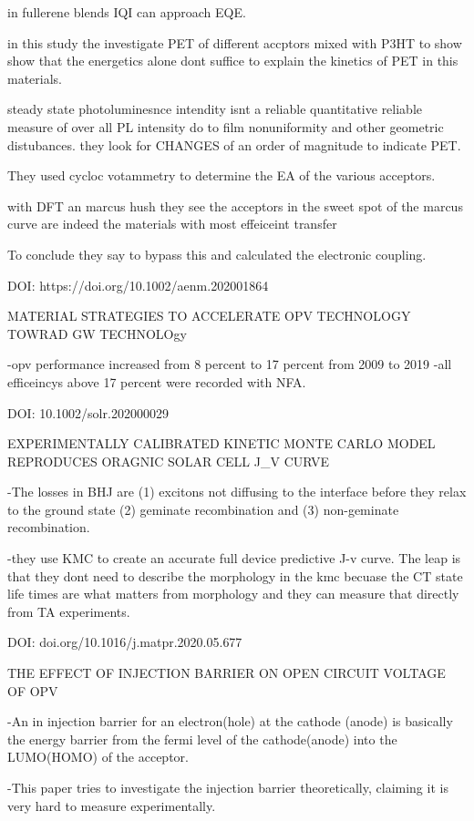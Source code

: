 		in fullerene blends IQI can approach EQE.

		in this study the investigate PET of different accptors mixed with P3HT to show
		show that the energetics alone dont suffice to explain the kinetics of PET
		in this materials.

		steady state photoluminesnce intendity isnt a reliable quantitative reliable measure
		of over all PL intensity do to film nonuniformity and other geometric distubances.
		they look for CHANGES of an order of magnitude to indicate PET. 

		They used cycloc votammetry to determine the EA of the various acceptors. 

		with DFT an marcus hush they see the acceptors in the sweet spot of the marcus
		curve are indeed the materials with most effeiceint transfer
			
		To conclude they say to bypass this and calculated the electronic coupling.

DOI: https://doi.org/10.1002/aenm.202001864

	MATERIAL STRATEGIES TO ACCELERATE OPV TECHNOLOGY TOWRAD GW TECHNOLOgy

		-opv performance increased from 8 percent to 17 percent from 2009 to 2019
		-all efficeincys above 17 percent were recorded with NFA. 

DOI: 10.1002/solr.202000029

        EXPERIMENTALLY CALIBRATED KINETIC MONTE CARLO MODEL REPRODUCES ORAGNIC SOLAR CELL J_V CURVE

    -The losses in BHJ are (1) excitons not diffusing to the interface before they relax to the ground state
        (2) geminate recombination and (3) non-geminate recombination. 

    -they use KMC to create an accurate full device predictive J-v curve. The leap is that they dont
        need to describe the morphology in the kmc becuase the CT state life times are what matters
        from morphology and they can measure that directly from TA experiments. 


DOI: doi.org/10.1016/j.matpr.2020.05.677

        THE EFFECT OF INJECTION BARRIER ON OPEN CIRCUIT VOLTAGE OF OPV

    -An in injection barrier for an electron(hole) at the cathode (anode) is basically the energy 
    barrier from the fermi level of the cathode(anode) into the LUMO(HOMO) of the acceptor.

    -This paper tries to investigate the injection barrier theoretically, claiming it is very hard to
    measure experimentally. 

